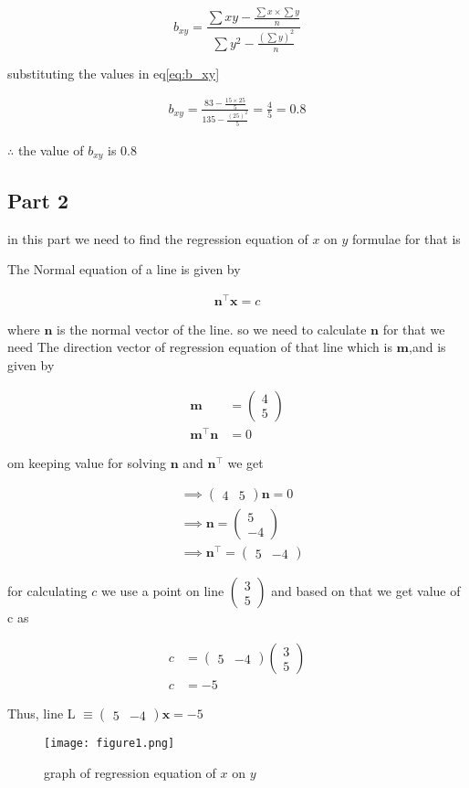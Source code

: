 \documentclass[journal,12pt,twocolumn]{IEEEtran}
\let\vec\mathbf
\newcommand{\myvec}[1]{\ensuremath{\begin{pmatrix}#1\end{pmatrix}}}
\begin{document}
    \begin{equation}
          \label{eq:b_xy}
          b_{xy}=\frac{\sum xy-\frac{{\sum x}\times  {\sum y}}{n} }{\sum y^{2}-\frac{(\sum y)^{2}}{n} }
    \end{equation}
      
     substituting the values in eq\eqref{eq:b_xy} 
 
    \begin{align}
        b_{xy}=\frac{83-\frac{15\times25}{5}}{135-\frac{(25)^{2}}{5} } = \frac{4}{5} = 0.8
    \end{align}
     
$\therefore$ the value of $b_{xy}$ is 0.8
 
 
 
\subsection*{\textbf{Part 2}}
 in this part we need to find the regression equation of $x$ on $y$ formulae for that is 

    The Normal equation of a line  is given by
  
    \begin{align}
     	\label{eq:normal_line}
        \vec{n}^{\top}\vec{x} = c
    \end{align}
    
	where $\vec{n}$ is the normal vector of the line. so we need to calculate $\vec{n}$ for that we need The direction vector of regression equation of that line which is $\vec{m}$,and is given by 
	
    \begin{align}
        \vec{m} &= \myvec{4 \\ 5} \\
	    \vec{m}^{\top}\vec{n} &= 0    
	\end{align} 
	
	om keeping value for solving $\vec{n}$ and $\vec{n}^{\top}$ we get
	
	\begin{align}
	    &\implies \myvec{4 & 5}\vec{n} = 0	\\
    	&\implies \vec{n} = \myvec{5 \\ -4} 	\\
    	&\implies \vec{n}^{\top} = \myvec{5 & -4}
    \end{align}
     
    for calculating $ c $ we use a point on line  \myvec{ 3 \\ 5}
    and based on that we get value of c as
    
    \begin{align}
        c&=\myvec{5 & -4} \myvec{ 3 \\ 5} \\
        c&=-5
    \end{align}
    
    Thus, line L $\equiv \myvec{5 & -4}\vec{x} = -5$



    \begin{figure}[h!]
        \centering
     	\texttt{[image: figure1.png]}
    	\caption{graph of regression equation of $x$ on $y$}
	\label{Fig1}
    \end{figure}
\end{document}
